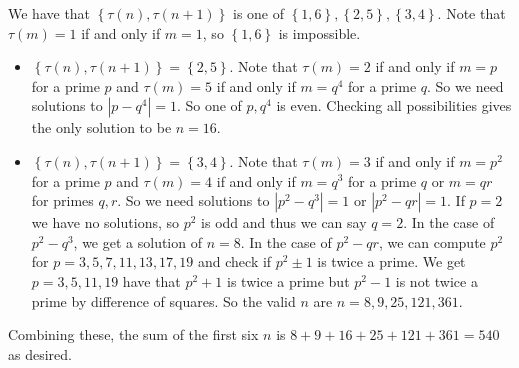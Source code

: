 We have that $\left\{\tau\left(n\right),\tau\left(n+1\right)\right\}$ is one of $\left\{1,6\right\},\left\{2,5\right\},\left\{3,4\right\}$. Note that $\tau\left(m\right)=1$ if and only if $m=1$, so $\left\{1,6\right\}$ is impossible.
\begin{itemize}
	\item $\left\{\tau\left(n\right),\tau\left(n+1\right)\right\}=\left\{2,5\right\}$. Note that $\tau\left(m\right)=2$ if and only if $m=p$ for a prime $p$ and $\tau\left(m\right)=5$ if and only if $m=q^4$ for a prime $q$. So we need solutions to $\left|p-q^4\right|=1$. So one of $p,q^4$ is even. Checking all possibilities gives the only solution to be $n=16$.
	\item $\left\{\tau\left(n\right),\tau\left(n+1\right)\right\}=\left\{3,4\right\}$. Note that $\tau\left(m\right)=3$ if and only if $m=p^2$ for a prime $p$ and $\tau\left(m\right)=4$ if and only if $m=q^3$ for a prime $q$ or $m=qr$ for primes $q,r$. So we need solutions to $\left|p^2-q^3\right|=1$ or $\left|p^2-qr\right|=1$. If $p=2$ we have no solutions, so $p^2$ is odd and thus we can say $q=2$. In the case of $p^2-q^3$, we get a solution of $n=8$. In the case of $p^2-qr$, we can compute $p^2$ for $p=3,5,7,11,13,17,19$ and check if $p^2\pm1$ is twice a prime. We get $p=3,5,11,19$ have that $p^2+1$ is twice a prime but $p^2-1$ is not twice a prime by difference of squares. So the valid $n$ are $n=8,9,25,121,361$.
\end{itemize}
Combining these, the sum of the first six $n$ is $8+9+16+25+121+361=\boxed{540}$ as desired.